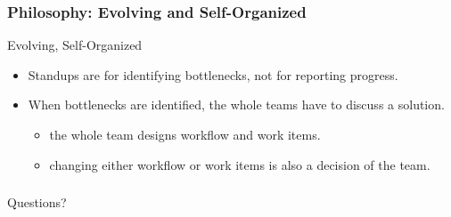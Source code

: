 \documentclass[lualatex]{beamer}
\begin{document}
\begin{frame}
  \frametitle{Philosophy: Evolving and Self-Organized}

  \begin{block}{Evolving, Self-Organized}
    \begin{itemize}
    \item Standups are for identifying bottlenecks, not for reporting progress.
    \item When bottlenecks are identified, the whole teams have to discuss a solution.
      \begin{itemize}
      \item the whole team designs workflow and work items.
      \item changing either workflow or work items is also a decision of the team.
      \end{itemize}
    \end{itemize}
  \end{block}
\end{frame}

\begin{frame}
  \frametitle{}
  \begin{center}
    \Huge
    Questions?
  \end{center}
\end{frame}
\end{document}
